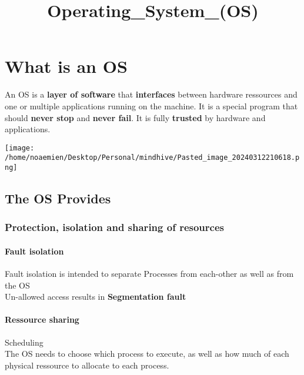 \documentclass[
]{article}
\title{Operating\_System\_(OS)}
\author{}
\date{}
\begin{document}
\maketitle

\hypertarget{what-is-an-os}{%
\section{What is an OS}\label{what-is-an-os}}

An OS is a \textbf{layer of software} that \textbf{interfaces} between
hardware ressources and one or multiple applications running on the
machine. It is a special program that should \textbf{never stop} and
\textbf{never fail}. It is fully \textbf{trusted} by hardware and
applications.

\texttt{[image: /home/noaemien/Desktop/Personal/mindhive/Pasted\_image\_20240312210618.png]}

\hypertarget{the-os-provides}{%
\subsection{The OS Provides}\label{the-os-provides}}

\hypertarget{protection-isolation-and-sharing-of-resources}{%
\subsubsection{\texorpdfstring{\textbf{Protection}, \textbf{isolation}
and sharing of
resources}{Protection, isolation and sharing of resources}}\label{protection-isolation-and-sharing-of-resources}}

\hypertarget{fault-isolation}{%
\paragraph{Fault isolation}\label{fault-isolation}}

Fault isolation is intended to separate Processes from each-other as
well as from the OS\\
Un-allowed access results in \textbf{Segmentation fault}

\hypertarget{ressource-sharing}{%
\paragraph{Ressource sharing}\label{ressource-sharing}}

Scheduling\\
The OS needs to choose which process to execute, as well as how much of
each physical ressource to allocate to each process.
\end{document}
